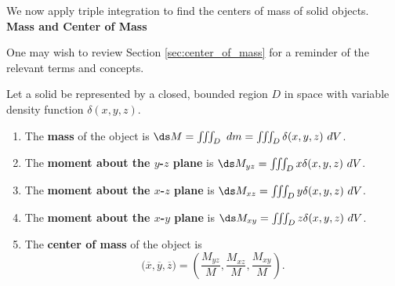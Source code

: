 We now apply triple integration to find the centers of mass of solid objects.\\

\noindent\textbf{\large Mass and Center of Mass}

One may wish to review Section \ref{sec:center_of_mass} for a reminder of the relevant terms and concepts. 

{Let a solid be represented by a closed, bounded region $D$ in space with variable density function $\delta(x,y,z)$. 
\begin{enumerate}
	\item The \textbf{mass} of the object is $\ds M= \iiint_D \ dm=\iiint_D \delta(x,y,z)\ dV$.
	\item	The \textbf{moment about the $y$-$z$ plane} is $\ds M_{yz}=\iiint_D x\delta(x,y,z)\ dV$.
	\item	The \textbf{moment about the $x$-$z$ plane} is $\ds M_{xz}=\iiint_D y\delta(x,y,z)\ dV$.
	\item	The \textbf{moment about the $x$-$y$ plane} is $\ds M_{xy}=\iiint_D z\delta(x,y,z)\ dV$.
	\item The \textbf{center of mass} of the object is
	$$\big(\overline{x},\overline{y},\overline{z}\big) = \left(\frac{M_{yz}}M,\frac{M_{xz}}M,\frac{M_{xy}}M\right).$$
\end{enumerate}
}

